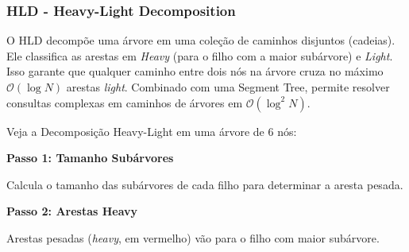 \subsubsection{HLD - Heavy-Light Decomposition}
O HLD decompõe uma árvore em uma coleção de caminhos disjuntos (cadeias). Ele
classifica as arestas em \textit{Heavy} (para o filho com a maior subárvore) e
\textit{Light}. Isso garante que qualquer caminho entre dois nós na árvore
cruza no máximo $\mathcal{O}(\log N)$ arestas \textit{light}. Combinado com uma
Segment Tree, permite resolver consultas complexas em caminhos de árvores em
$\mathcal{O}(\log^2 N)$.

Veja a Decomposição Heavy-Light em uma árvore de 6 nós:\\ \vspace{0.5cm}
\noindent
\begin{minipage}[t]{0.31\textwidth}
    \centering
    \textbf{Passo 1: Tamanho Subárvores}\\
    \vspace{0.2cm}

    \vspace{0.2cm}
    \footnotesize
    \raggedright
    Calcula o tamanho das subárvores de cada filho para determinar a aresta pesada.
\end{minipage}%
\hfill
%
\begin{minipage}[t]{0.31\textwidth}
    \centering
    \textbf{Passo 2: Arestas Heavy}\\
    \vspace{0.2cm}

    \vspace{0.2cm}
    \footnotesize
    \raggedright
    Arestas pesadas (\textit{heavy}, em vermelho) vão para o filho com maior subárvore.
\end{minipage}%
